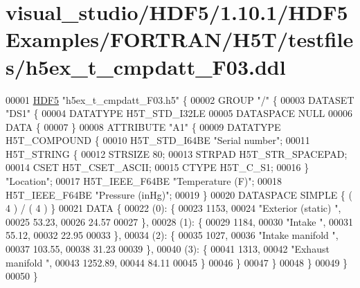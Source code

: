 \hypertarget{visual__studio_2_h_d_f5_21_810_81_2_h_d_f5_examples_2_f_o_r_t_r_a_n_2_h5_t_2testfiles_2h5ex__t__cmpdatt___f03_8ddl_source}{}\section{visual\+\_\+studio/\+H\+D\+F5/1.10.1/\+H\+D\+F5\+Examples/\+F\+O\+R\+T\+R\+A\+N/\+H5\+T/testfiles/h5ex\+\_\+t\+\_\+cmpdatt\+\_\+\+F03.ddl}
\label{visual__studio_2_h_d_f5_21_810_81_2_h_d_f5_examples_2_f_o_r_t_r_a_n_2_h5_t_2testfiles_2h5ex__t__cmpdatt___f03_8ddl_source}

\begin{DoxyCode}
00001 \hyperlink{namespace_h_d_f5}{HDF5} \textcolor{stringliteral}{"h5ex\_t\_cmpdatt\_F03.h5"} \{
00002 GROUP \textcolor{stringliteral}{"/"} \{
00003    DATASET \textcolor{stringliteral}{"DS1"} \{
00004       DATATYPE  H5T\_STD\_I32LE
00005       DATASPACE  NULL
00006       DATA \{
00007       \}
00008       ATTRIBUTE \textcolor{stringliteral}{"A1"} \{
00009          DATATYPE  H5T\_COMPOUND \{
00010             H5T\_STD\_I64BE \textcolor{stringliteral}{"Serial number"};
00011             H5T\_STRING \{
00012                STRSIZE 80;
00013                STRPAD H5T\_STR\_SPACEPAD;
00014                CSET H5T\_CSET\_ASCII;
00015                CTYPE H5T\_C\_S1;
00016             \} \textcolor{stringliteral}{"Location"};
00017             H5T\_IEEE\_F64BE \textcolor{stringliteral}{"Temperature (F)"};
00018             H5T\_IEEE\_F64BE \textcolor{stringliteral}{"Pressure (inHg)"};
00019          \}
00020          DATASPACE  SIMPLE \{ ( 4 ) / ( 4 ) \}
00021          DATA \{
00022          (0): \{
00023                1153,
00024                \textcolor{stringliteral}{"Exterior (static)                                                               "},
00025                53.23,
00026                24.57
00027             \},
00028          (1): \{
00029                1184,
00030                \textcolor{stringliteral}{"Intake                                                                          "},
00031                55.12,
00032                22.95
00033             \},
00034          (2): \{
00035                1027,
00036                \textcolor{stringliteral}{"Intake manifold                                                                 "},
00037                103.55,
00038                31.23
00039             \},
00040          (3): \{
00041                1313,
00042                \textcolor{stringliteral}{"Exhaust manifold                                                                "},
00043                1252.89,
00044                84.11
00045             \}
00046          \}
00047       \}
00048    \}
00049 \}
00050 \}
\end{DoxyCode}
